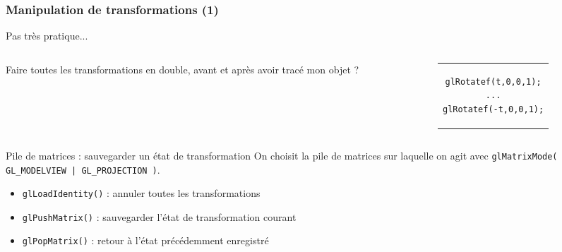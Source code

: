 \documentclass{beamer}
\begin{document}
\begin{frame}[fragile]
\frametitle{Manipulation de transformations (1)}
	\begin{exampleblock}{Pas très pratique...}
		\begin{columns}
			\begin{column}{0.45\textwidth}
				\begin{block}{}
					Faire toutes les transformations en double, avant et après avoir tracé mon objet ?
				\end{block}
			\end{column}
			\begin{column}{0.45\textwidth}
				\begin{block}{}
					\begin{figure}[h]
						\centering
						\begin{tabular}{c}
							\begin{lstlisting}
glRotatef(t,0,0,1);
...
glRotatef(-t,0,0,1);
							\end{lstlisting}
						\end{tabular}
					\end{figure}
				\end{block}
			\end{column}
		\end{columns}
	\end{exampleblock}
	\pause
	\begin{block}{Pile de matrices : sauvegarder un état de transformation}
		On choisit la pile de matrices sur laquelle on agit avec \verb!glMatrixMode( GL_MODELVIEW | GL_PROJECTION )!.
		\begin{itemize}
			\item \verb!glLoadIdentity()! : annuler toutes les transformations
			\item \verb!glPushMatrix()! : sauvegarder l'état de transformation courant
			\item \verb!glPopMatrix()! : retour à l'état précédemment enregistré
		\end{itemize}
	\end{block}
\end{frame}
\end{document}
